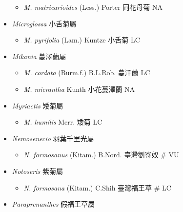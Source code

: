 \begin{itemize}
  \begin{itemize}
        \item[] \textit{M. matricarioides} (Less.) Porter  同花母菊   NA
  \end{itemize}
 \item[] \textit{Microglossa} 小舌菊屬
                                
  \begin{itemize}
        \item[] \textit{M. pyrifolia} (Lam.) Kuntze  小舌菊   LC
  \end{itemize}
 \item[] \textit{Mikania} 蔓澤蘭屬
                                
  \begin{itemize}
        \item[] \textit{M. cordata} (Burm.f.) B.L.Rob.  蔓澤蘭   LC
        \item[] \textit{M. micrantha} Kunth  小花蔓澤蘭   NA
  \end{itemize}
 \item[] \textit{Myriactis} 矮菊屬
                                
  \begin{itemize}
        \item[] \textit{M. humilis} Merr.  矮菊   LC
  \end{itemize}
 \item[] \textit{Nemosenecio} 羽葉千里光屬
                                
  \begin{itemize}
        \item[] \textit{N. formosanus} (Kitam.) B.Nord.  臺灣劉寄奴  \# VU
  \end{itemize}
 \item[] \textit{Notoseris} 紫菊屬
                                
  \begin{itemize}
        \item[] \textit{N. formosana} (Kitam.) C.Shih  臺灣福王草  \# LC
  \end{itemize}
 \item[] \textit{Paraprenanthes} 假福王草屬
                                

\end{itemize}

